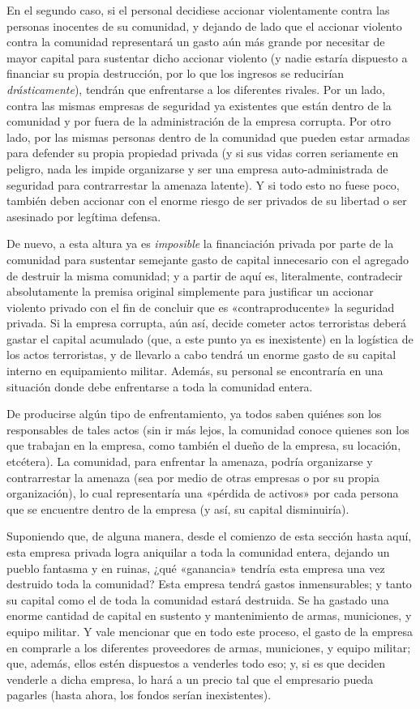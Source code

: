\documentclass[12pt,a4paper,twoside]{book}
\begin{document}
En el segundo caso, si el personal decidiese accionar violentamente contra las personas inocentes de su comunidad, y dejando de lado que el accionar violento contra la comunidad representará un gasto aún más grande por necesitar de mayor capital para sustentar dicho accionar violento (y nadie estaría dispuesto a financiar su propia destrucción, por lo que los ingresos se reducirían \textit{drásticamente}), tendrán que enfrentarse a los diferentes rivales. Por un lado, contra las mismas empresas de seguridad ya existentes que están dentro de la comunidad y por fuera de la administración de la empresa corrupta. Por otro lado, por las mismas personas dentro de la comunidad que pueden estar armadas para defender su propia propiedad privada (y si sus vidas corren seriamente en peligro, nada les impide organizarse y ser una empresa auto-administrada de seguridad para contrarrestar la amenaza latente). Y si todo esto no fuese poco, también deben accionar con el enorme riesgo de ser privados de su libertad o ser asesinado por legítima defensa.

De nuevo, a esta altura ya es \textit{imposible} la financiación privada por parte de la comunidad para sustentar semejante gasto de capital innecesario con el agregado de destruir la misma comunidad; y a partir de aquí es, literalmente, contradecir absolutamente la premisa original simplemente para justificar un accionar violento privado con el fin de concluir que es «contraproducente» la seguridad privada. Si la empresa corrupta, aún así, decide cometer actos terroristas deberá gastar el capital acumulado (que, a este punto ya es inexistente) en la logística de los actos terroristas, y de llevarlo a cabo tendrá un enorme gasto de su capital interno en equipamiento militar. Además, su personal se encontraría en una situación donde debe enfrentarse a toda la comunidad entera.

De producirse algún tipo de enfrentamiento, ya todos saben quiénes son los responsables de tales actos (sin ir más lejos, la comunidad conoce quienes son los que trabajan en la empresa, como también el dueño de la empresa, su locación, etcétera). La comunidad, para enfrentar la amenaza, podría organizarse y contrarrestar la amenaza (sea por medio de otras empresas o por su propia organización), lo cual representaría una «pérdida de activos» por cada persona que se encuentre dentro de la empresa (y así, su capital disminuiría). 

Suponiendo que, de alguna manera, desde el comienzo de esta sección hasta aquí, esta empresa privada logra aniquilar a toda la comunidad entera, dejando un pueblo fantasma y en ruinas, ¿qué «ganancia» tendría esta empresa una vez destruido toda la comunidad? Esta empresa tendrá gastos inmensurables; y tanto su capital como el de toda la comunidad estará destruida. Se ha gastado una enorme cantidad de capital en sustento y mantenimiento de armas, municiones, y equipo militar. Y vale mencionar que en todo este proceso, el gasto de la empresa en comprarle a los diferentes proveedores de armas, municiones, y equipo militar; que, además, ellos estén dispuestos a venderles todo eso; y, si es que deciden venderle a dicha empresa, lo hará a un precio tal que el empresario pueda pagarles (hasta ahora, los fondos serían inexistentes).
\end{document}
